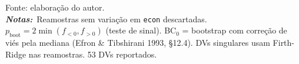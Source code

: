 \par\smallskip\noindent\begin{minipage}{\linewidth}\footnotesize\sloppy\centering
Fonte: elaboração do autor.\\
\textit{\textbf{Notas:}}\ Reamostras sem variação em \texttt{econ} descartadas. $p_\text{boot} = 2\min(f_{<0},f_{>0})$ (teste de sinal). BC$_0$ = bootstrap com correção de viés pela mediana (Efron \& Tibshirani 1993, \S12.4). DVs singulares usam Firth-Ridge nas reamostras. 53 DVs reportados.
\end{minipage}
\endgroup
